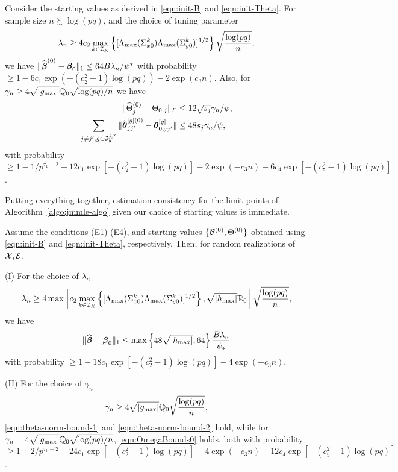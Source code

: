 \begin{Theorem}\label{thm:starting-values}
Consider the starting values as derived in \eqref{eqn:init-B} and \eqref{eqn:init-Theta}. For sample size $n \succsim \log(pq)$, and the choice of tuning parameter
%
\[
\lambda_n \geq 4 c_2 \max_{k \in {\cal{I}}_K} \left\{ [\Lambda_{\max} (\Sigma_{x 0}^k) \Lambda_{\max} (\Sigma_{y 0}^k)]^{1/2} \right\}
\sqrt{ \frac{\log (pq)}{n}},
\]
%
we have $\| \widehat {{\boldsymbol{\beta}}}^{(0)} - {\boldsymbol{\beta}}_0 \|_1 \leq 64 B \lambda_n /\psi^*$ with probability $\geq 1 - 6c_1 \exp( -(c_2^2-1) \log(pq)) - 2 \exp(c_3 n)$. Also, for $\gamma_n \geq 4\sqrt{| g_{\max}|} {\mathbb{Q}}_0 \sqrt{ \log (pq)/n}$ we have
%
\begin{align*}
\| \widehat \Theta_j^{(0)} - \Theta_{0,j} \|_F & \leq 12 \sqrt{s_j} \gamma_n / \psi,\\
\sum_{j \neq j', g \in {\cal{G}}_y^{jj'}} \| \hat {{\boldsymbol{\theta}}}_{jj'}^{[g](0)} - {\boldsymbol{\theta}}_{0,jj'}^{[g]} \| & \leq 48 s_j \gamma_n / \psi,
\end{align*}
%
with probability $\geq 1 - 1/p^{\tau_1-2} - 12 c_1 \exp [-(c_2^2-1) \log(pq)] - 2 \exp (- c_3 n) - 6c_4 \exp [-(c_5^2-1) \log(pq)]$.
\end{Theorem}
%

Putting everything together, estimation consistency for the limit points of Algorithm~\ref{algo:jmmle-algo} given our choice of starting values is immediate.

\begin{Corollary}\label{corollary:jmmle-final}
Assume the conditions (E1)-(E4), and starting values $\{ {\cal{B}}^{(0)}, \Theta^{(0)} \}$ obtained using \eqref{eqn:init-B} and \eqref{eqn:init-Theta}, respectively. Then, for random realizations of ${\cal{X}}, {\cal{E}}$,
%

\vspace{1em}
\noindent (I) For the choice of $\lambda_n$
%
$$
\lambda_n \geq 4 \max \left[ c_2 \max_{k \in {\cal{I}}_K} \left\{ [\Lambda_{\max} (\Sigma_{x 0}^k) \Lambda_{\max} (\Sigma_{y 0}^k)]^{1/2} \right\}, \sqrt{| h_{\max}|} {\mathbb{R}}_0 \right] \sqrt{\frac{\log(pq)}{n}},
$$
%
we have
%
$$
\| \widehat {{\boldsymbol{\beta}}} - {\boldsymbol{\beta}}_0 \|_1 \leq \max \left\{ 48 \sqrt{ | h_{\max} |}, 64 \right\} \frac{B \lambda_n}{\psi_*}
$$
%
with probability $\geq 1 - 18 c_1 \exp[-(c_2^2-1) \log(pq)] - 4 \exp( -c_3 n)$.

\vspace{1em}
\noindent (II) For the choice of $\gamma_n$
%
$$
\gamma_n \geq 4 \sqrt{ | g_{\max} |} {\mathbb{Q}}_0 \sqrt{\frac{\log(pq)}{n}},
$$
%
\eqref{eqn:theta-norm-bound-1} and \eqref{eqn:theta-norm-bound-2} hold, while for $\gamma_n = 4 \sqrt{ | g_{\max} |} {\mathbb{Q}}_0 \sqrt{ \log (pq)/n}$, \eqref{eqn:OmegaBounds0} holds, both with probability $\geq 1 - 2/p^{\tau_1-2} - 24 c_1 \exp [-(c_2^2-1) \log(pq)] - 4 \exp (- c_3 n) - 12 c_4 \exp [-(c_5^2-1) \log(pq)]$.
\end{Corollary}
